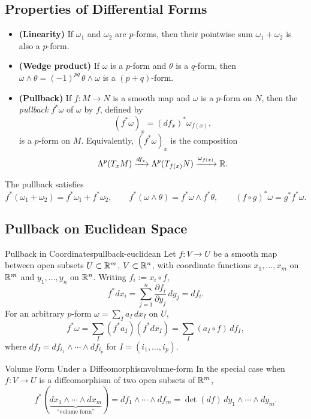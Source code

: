 \subsection{Properties of Differential Forms}

\begin{itemize}
    \item \textbf{(Linearity)} If $\omega_1$ and $\omega_2$ are $p$-forms, then their pointwise sum $\omega_1 + \omega_2$ is also a $p$-form.
    \item \textbf{(Wedge product)} If $\omega$ is a $p$-form and $\theta$ is a $q$-form, then $\omega \wedge \theta = (-1)^{pq}\, \theta \wedge \omega$ is a $(p+q)$-form.
    \item \textbf{(Pullback)} If $f \colon M \to N$ is a smooth map and $\omega$ is a $p$-form on $N$, then the \emph{pullback} $f^*\omega$ of $\omega$ by $f$, defined by
    \[
        (f^*\omega)_x = (df_x)^* \omega_{f(x)},
    \]
    is a $p$-form on $M$. Equivalently, $(f^*\omega)_x$ is the composition
    \[
        \Lambda^p(T_x M) \xrightarrow{df_x} \Lambda^p(T_{f(x)} N) \xrightarrow{\omega_{f(x)}} \mathbb{R}.
    \]
\end{itemize}

The pullback satisfies
\[
    f^*(\omega_1 + \omega_2) = f^*\omega_1 + f^*\omega_2, \qquad
    f^*(\omega \wedge \theta) = f^*\omega \wedge f^*\theta, \qquad
    (f \circ g)^* \omega = g^* f^* \omega.
\]

\subsection{Pullback on Euclidean Space}

\begin{example}{Pullback in Coordinates}{pullback-euclidean}
    Let $f \colon V \to U$ be a smooth map between open subsets $U \subset \mathbb{R}^m$, $V \subset \mathbb{R}^n$, with coordinate functions $x_1, \ldots, x_m$ on $\mathbb{R}^m$ and $y_1, \ldots, y_n$ on $\mathbb{R}^n$. Writing $f_i := x_i \circ f$,
    \[
        f^* dx_i = \sum_{j=1}^{n} \frac{\partial f_i}{\partial y_j}\, dy_j = df_i.
    \]
    For an arbitrary $p$-form $\omega = \sum_I a_I\, dx_I$ on $U$,
    \[
        f^* \omega = \sum_I (f^* a_I)(f^* dx_I) = \sum_I (a_I \circ f)\, df_I,
    \]
    where $df_I = df_{i_1} \wedge \cdots \wedge df_{i_p}$ for $I = (i_1, \ldots, i_p)$.
\end{example}

\begin{example}{Volume Form Under a Diffeomorphism}{volume-form}
    In the special case when $f \colon V \to U$ is a diffeomorphism of two open subsets of $\mathbb{R}^m$,
    \[
        f^*(\underbrace{dx_1 \wedge \cdots \wedge dx_m}_{\text{``volume form''}}) = df_1 \wedge \cdots \wedge df_m = \det(df)\, dy_1 \wedge \cdots \wedge dy_m.
    \]
\end{example}

